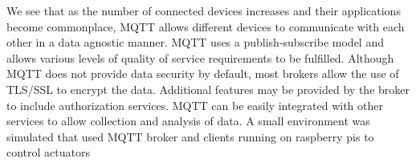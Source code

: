 \documentclass[sigconf]{acmart}
\begin{document}
We see that as the number of connected devices increases and their
applications become commonplace, MQTT allows different devices to
communicate with each other in a data agnostic manner. MQTT uses a
publish-subscribe model and allows various levels of quality of
service requirements to be fulfilled. Although MQTT does not provide
data security by default, most brokers allow the use of TLS/SSL to
encrypt the data. Additional features may be provided by the broker to
include authorization services. MQTT can be easily integrated with
other services to allow collection and analysis of data. A small
environment was simulated that used MQTT broker and clients running on
raspberry pis to control actuators


 
\end{document}
